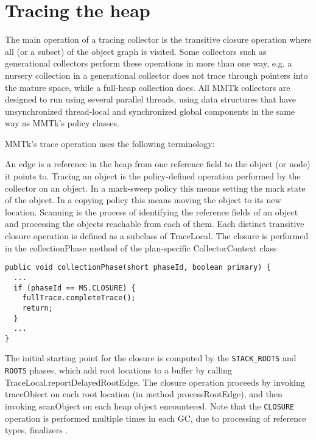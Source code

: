 \section{Tracing the heap}

The main operation of a tracing collector is the transitive closure operation where all (or a subset) of the object graph is visited.  Some collectors such as generational collectors perform these operations in more than one way, e.g. a nursery collection in a generational collector does not trace through pointers into the mature space, while a full-heap collection does.  All MMTk collectors are designed to run using several parallel threads, using data structures that have unsynchronized thread-local and synchronized global components in the same way as MMTk's policy classes.

MMTk's trace operation uses the following terminology:

An edge is a reference in the heap from one reference field to the object (or node) it points to.
Tracing an object is the policy-defined operation performed by the collector on an object.  In a mark-sweep policy this means setting the mark state of the object.  In a copying policy this means moving the object to its new location.
Scanning is the process of identifying the reference fields of an object and processing the objects reachable from each of them.
Each distinct transitive closure operation is defined as a subclass of TraceLocal.  
The closure is performed in the collectionPhase method of the plan-specific CollectorContext class
\begin{lstlisting}[name=MSCollectorjava,caption=\lstname: initiating a trace of the heap.,label=fig:gc:collect-closure]
public void collectionPhase(short phaseId, boolean primary) {
  ...
  if (phaseId == MS.CLOSURE) {
    fullTrace.completeTrace();
    return;
  }
  ...
}
\end{lstlisting}
The initial starting point for the closure is computed by the
\lstinline|STACK_ROOTS| and \lstinline|ROOTS| phases, which add root locations
to a buffer by calling TraceLocal.reportDelayedRootEdge.  
The closure operation proceeds by invoking traceObiect on each root location 
(in method processRootEdge), and then invoking scanObject on each heap object encountered.  
Note that the \lstinline|CLOSURE| operation is performed multiple times in each
GC, due to processing of reference types, finalizers \etc.

